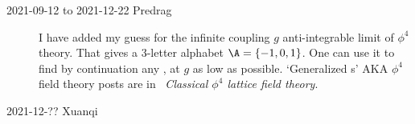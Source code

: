 \begin{description}
\item[2021-09-12 to 2021-12-22 Predrag]
I have added my guess  for the infinite coupling $g$
anti-integrable limit of $\phi^4$ theory. That gives a 3-letter
alphabet $\A=\{-1,0,1\}$. One can use it to find by
continuation any {\lattstate}, at $g$ as low as possible.
`Generalized {\HenonMap}s' AKA $\phi^4$ field theory posts are in
~{\em Classical {$\phi^4$} lattice field theory}.

\item[2021-12-?? Xuanqi]











\end{description}

\bigskip

\renewcommand{\ssp}{\ensuremath{x}}             %
\renewcommand{\Ssym}[1]{{\ensuremath{s_{#1}}}}    %
\renewcommand{\Refl}{\ensuremath{\sigma}}             %
\renewcommand{\shift}{\ensuremath{d}}                 %

\printbibliography[heading=subbibintoc,title={References}]

\ChapterEnd %
